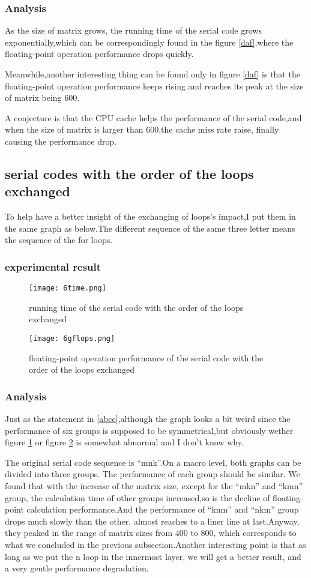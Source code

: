 \documentclass[11pt]{scrartcl} %
\begin{document}
	\subsubsection{Analysis}
	As the size of matrix grows, the running time of the serial code grows exponentially,which can be correspondingly found in the figure \ref{daf},where the floating-point operation performance drops quickly.

	Meanwhile,another interesting thing can be found only in figure \ref{daf} is that the floating-point operation performance keeps rising and reaches its peak at the size of matrix being 600.

	A conjecture is that the CPU cache helps the performance of the serial code,and when the size of matrix is larger than 600,the cache miss rate raise, finally causing the performance drop.
\subsection{serial codes with the order of the loops exchanged}
	To help have a better insight of the exchanging of loops's impact,I put them in the same graph as below.The different sequence of the same three letter means the sequence of the for loops.
	\subsubsection{experimental result}
		\begin{figure}[H]
			\centering
			\texttt{[image: 6time.png]}
			\caption{running time of the serial code with the order of the loops exchanged}
			\label{sb1}
		\end{figure}
		\begin{figure}[H]
			\centering
			\texttt{[image: 6gflops.png]}
			\caption{floating-point operation performance of the serial code with the order of the loops exchanged}
			\label{sb2}
		\end{figure}
		\subsubsection{Analysis}
		Just as the statement in \ref{abcc},although the graph looks a bit weird since the performance of six groups is supposed to be symmetrical,but obviously wether  figure \ref{sb1} or figure \ref{sb2} is somewhat abnormal and I don't know why.

		The original serial code sequence is ``mnk''.On a macro level, both graphs can be divided into three groups. The performance of each group should be similar. We found that with the increase of the matrix size, except for the ``mkn'' and ``kmn'' group, the calculation time of other groups increased,so is the decline of floating-point calculation performance.And the performance of  ``knm'' and ``nkm'' group drops much slowly than the other, almost reaches to a liner line at last.Anyway, they peaked in the range of matrix sizes from 400 to 800, which corresponds to what we concluded in the previous subsection.Another interesting point is that as long as we put the n loop in the innermost layer, we will get a better result, and a very gentle performance degradation.
\end{document}
